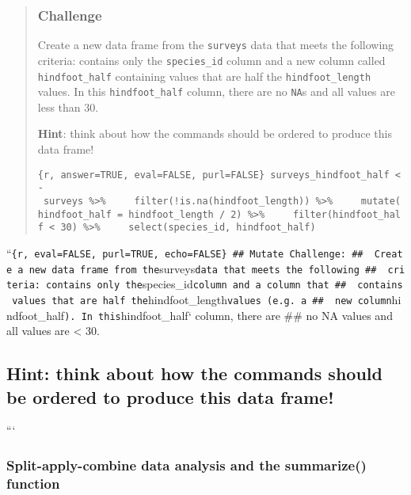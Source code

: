 \documentclass[]{article}
\begin{document}
\begin{quote}
\subsubsection{Challenge}\label{challenge-1}

Create a new data frame from the \texttt{surveys} data that meets the
following criteria: contains only the \texttt{species\_id} column and a
new column called \texttt{hindfoot\_half} containing values that are
half the \texttt{hindfoot\_length} values. In this
\texttt{hindfoot\_half} column, there are no \texttt{NA}s and all values
are less than 30.

\textbf{Hint}: think about how the commands should be ordered to produce
this data frame!

\texttt{\{r,\ answer=TRUE,\ eval=FALSE,\ purl=FALSE\}\ surveys\_hindfoot\_half\ \textless{}-\ surveys\ \%\textgreater{}\%\ \ \ \ \ filter(!is.na(hindfoot\_length))\ \%\textgreater{}\%\ \ \ \ \ mutate(hindfoot\_half\ =\ hindfoot\_length\ /\ 2)\ \%\textgreater{}\%\ \ \ \ \ filter(hindfoot\_half\ \textless{}\ 30)\ \%\textgreater{}\%\ \ \ \ \ select(species\_id,\ hindfoot\_half)}
\end{quote}

``\texttt{\{r,\ eval=FALSE,\ purl=TRUE,\ echo=FALSE\}\ \#\#\ Mutate\ Challenge:\ \#\#\ \ Create\ a\ new\ data\ frame\ from\ the}surveys\texttt{data\ that\ meets\ the\ following\ \#\#\ \ criteria:\ contains\ only\ the}species\_id\texttt{column\ and\ a\ column\ that\ \#\#\ \ contains\ values\ that\ are\ half\ the}hindfoot\_length\texttt{values\ (e.g.\ a\ \#\#\ \ new\ column}hindfoot\_half\texttt{).\ In\ this}hindfoot\_half`
column, there are \#\# no NA values and all values are \textless{} 30.

\subsection{Hint: think about how the commands should be ordered to
produce this data
frame!}\label{hint-think-about-how-the-commands-should-be-ordered-to-produce-this-data-frame}

```

\subsubsection{Split-apply-combine data analysis and the summarize()
function}\label{split-apply-combine-data-analysis-and-the-summarize-function}
\end{document}

